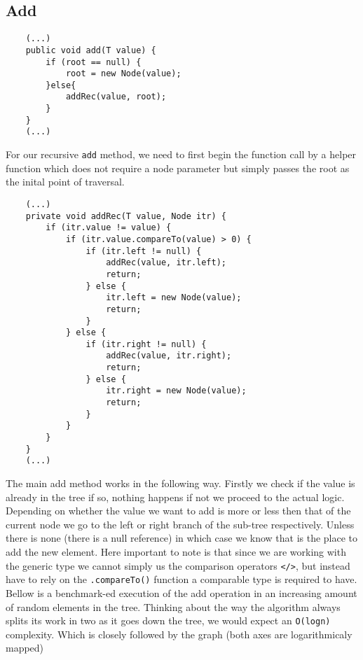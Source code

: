 \documentclass[a4paper,11pt]{article}
\begin{document}
\subsection*{Add}

\begin{verbatim}
    (...)
    public void add(T value) {
        if (root == null) {
            root = new Node(value);
        }else{
            addRec(value, root);
        }
    }
    (...)
\end{verbatim}

For our recursive {\tt add} method, we need to first begin the function call by a helper function which does not require a node parameter but simply passes the root as the inital point of traversal.

\begin{verbatim}
    (...)
    private void addRec(T value, Node itr) {
        if (itr.value != value) {
            if (itr.value.compareTo(value) > 0) {
                if (itr.left != null) {
                    addRec(value, itr.left);
                    return;
                } else {
                    itr.left = new Node(value);
                    return;
                }
            } else {
                if (itr.right != null) {
                    addRec(value, itr.right);
                    return;
                } else {
                    itr.right = new Node(value);
                    return;
                }
            }
        }
    }
    (...)
\end{verbatim}

The main add method works in the following way. Firstly we check if the value is already in the tree if so, nothing happens if not we proceed to the actual logic. Depending on whether the value we want to add is more or less then that of the current node we go to the left or right branch of the sub-tree respectively. Unless there is none (there is a null reference) in which case we know that is the place to add the new element. Here important to note is that since we are working with the generic type we cannot simply us the comparison operators {\tt </>}, but instead have to rely on the {\tt.compareTo()} function a comparable type is required to have. 
\\

Bellow is a benchmark-ed execution of the add operation in an increasing amount of random elements in the tree. Thinking about the way the algorithm always splits its work in two as it goes down the tree, we would expect an {\tt O(logn)} complexity. Which is closely followed by the graph (both axes are logarithmicaly mapped)
\end{document}
